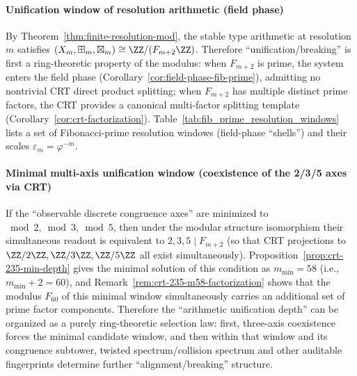 \paragraph{Unification window of resolution arithmetic (field phase)}
By Theorem~\ref{thm:finite-resolution-mod}, the stable type arithmetic at resolution $m$ satisfies
\((X_m,\boxplus_m,\boxtimes_m)\cong \ZZ/(F_{m+2}\ZZ)\).
Therefore ``unification/breaking'' is first a ring-theoretic property of the modulus: when $F_{m+2}$ is prime, the system enters the field phase (Corollary~\ref{cor:field-phase-fib-prime}), admitting no nontrivial CRT direct product splitting;
when $F_{m+2}$ has multiple distinct prime factors, the CRT provides a canonical multi-factor splitting template (Corollary~\ref{cor:crt-factorization}).
Table~\ref{tab:fib_prime_resolution_windows} lists a set of Fibonacci-prime resolution windows (field-phase ``shells'') and their scales $\varepsilon_m=\varphi^{-m}$.




\paragraph{Minimal multi-axis unification window (coexistence of the 2/3/5 axes via CRT)}
If the ``observable discrete congruence axes'' are minimized to \(\bmod 2,\bmod 3,\bmod 5\),
then under the modular structure isomorphism their simultaneous readout is equivalent to
\(
2,3,5\mid F_{m+2}
\)
(so that CRT projections to \(\ZZ/2\ZZ,\ZZ/3\ZZ,\ZZ/5\ZZ\) all exist simultaneously).
Proposition~\ref{prop:crt-235-min-depth} gives the minimal solution of this condition as \(m_{\min}=58\) (i.e., \(m_{\min}+2=60\)),
and Remark~\ref{rem:crt-235-m58-factorization} shows that the modulus \(F_{60}\) of this minimal window simultaneously carries an additional set of prime factor components.
Therefore the ``arithmetic unification depth'' can be organized as a purely ring-theoretic selection law: first, three-axis coexistence forces the minimal candidate window, and then within that window and its congruence subtower, twisted spectrum/collision spectrum and other auditable fingerprints determine further ``alignment/breaking'' structure.

